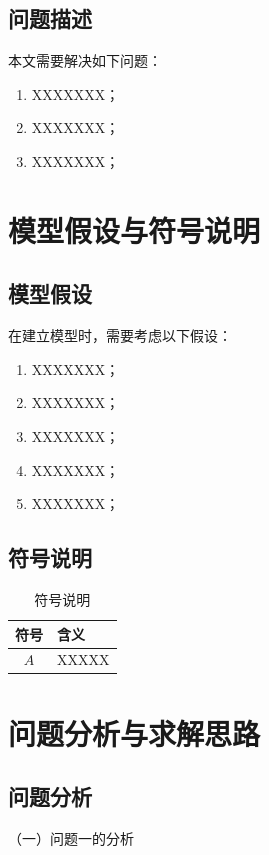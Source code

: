 \documentclass[12pt,a4paper]{article}
\begin{document}
\subsection{问题描述}

本文需要解决如下问题：

\begin{enumerate}[label=\hfill\arabic*.,left=0pt]
    \item XXXXXXX；
    \item XXXXXXX；
    \item XXXXXXX；
\end{enumerate}

\clearpage
\section{模型假设与符号说明}
\subsection{模型假设}

在建立模型时，需要考虑以下假设：
\begin{enumerate}[label=\textbf{假设} \arabic*,left=0pt,itemsep=0pt]
    \item XXXXXXX；
    \item XXXXXXX；
    \item XXXXXXX；
    \item XXXXXXX；
    \item XXXXXXX；
\end{enumerate}


\subsection{符号说明}

\begin{table}[h!]
    \centering
    \caption{符号说明}
    \begin{tabular}{cl}
    \toprule
    符号 & 含义  \\ 
    \midrule
    $A$ & XXXXX  \\
    \bottomrule
    \end{tabular}
    \label{table:符号说明}
    \end{table}

    \clearpage
\section{问题分析与求解思路}
\subsection{问题分析}
（一）问题一的分析
\end{document}
